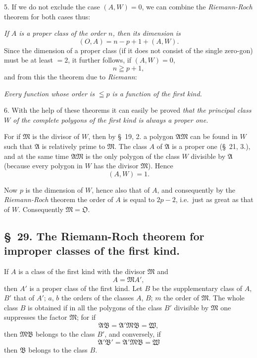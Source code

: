 \documentclass{article}
\begin{document}
5. If we do not exclude the case $(A, W) = 0$, we can combine the \emph{Riemann-Roch} theorem for both cases thus:

\emph{If $A$ is a proper class of the order $n$, then its dimension is}
\[ (O, A) = n-p+1+(A, W). \]
Since the dimension of a proper class (if it does not consist of the single zero-gon) must be at least $= 2$, it further follows, if $(A, W) = 0$,
\[ n \geqq p+1, \]
and from this the theorem due to \emph{Riemann}:

\emph{Every function whose order is $\leqq p$ is a function of the first kind.}

6. With the help of these theorems it can easily be proved \emph{that the principal class $W$ of the complete polygons of the first kind is always a proper one.}

For if $\mathfrak{M}$ is the divisor of $W$, then by §~19, 2. a polygon $\mathfrak{A}\mathfrak{M}$ can be found in $W$ such that $\mathfrak{A}$ is relatively prime to $\mathfrak{M}$. The class $A$ of $\mathfrak{A}$ is a proper one (§~21, 3.), and at the same time $\mathfrak{A}\mathfrak{M}$ is the only polygon of the class $W$ divisible by $\mathfrak{A}$ (because every polygon in $W$ has the divisor $\mathfrak{M}$). Hence
\[ (A, W) = 1. \]

Now $p$ is the dimension of $W$, hence also that of $A$, and consequently by the \emph{Riemann-Roch} theorem the order of $A$ is equal to $2p-2$, i.e.\ just as great as that of $W$. Consequently $\mathfrak{M} = \mathfrak{O}$.

\subsection*{§~29. The Riemann-Roch theorem for improper classes of the first kind.}

If $A$ is a class of the first kind with the divisor $\mathfrak{M}$ and
\[ A = \mathfrak{M}A', \]
then $A'$ is a proper class of the first kind. Let $B$ be the supplementary class of $A$, $B'$ that of $A'$; $a$, $b$ the orders of the classes $A$, $B$; $m$ the order of $\mathfrak{M}$. The whole class $B$ is obtained if in all the polygons of the class $B'$ divisible by $\mathfrak{M}$ one suppresses the factor $\mathfrak{M}$; for if
\[ \mathfrak{A}\mathfrak{B} = \mathfrak{A}'\mathfrak{M}\mathfrak{B} = \mathfrak{W}, \]
then $\mathfrak{M}\mathfrak{B}$ belongs to the class $B'$, and conversely, if
\[ \mathfrak{A}'\mathfrak{B}' = \mathfrak{A}'\mathfrak{M}\mathfrak{B} = \mathfrak{W} \]
then $\mathfrak{B}$ belongs to the class $B$.
\end{document}

